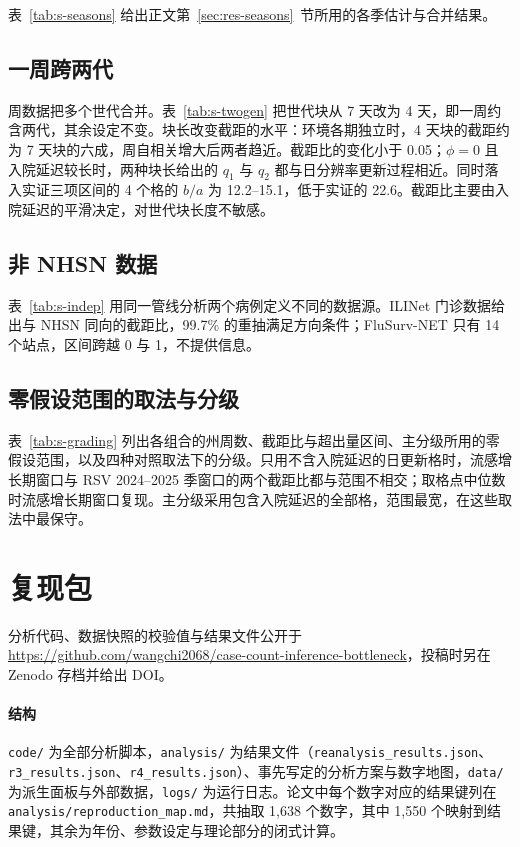 \documentclass[fontset=none,10pt,a4paper]{ctexart}
\theoremstyle{zhplain}
\begin{document}
表~\ref{tab:s-seasons} 给出正文第~\ref{sec:res-seasons}~节所用的各季估计与合并结果。

\subsection{一周跨两代}
\label{sec:s-twogen}

周数据把多个世代合并。表~\ref{tab:s-twogen} 把世代块从 7 天改为 4 天，即一周约含两代，其余设定不变。块长改变截距的水平：环境各期独立时，4 天块的截距约为 7 天块的六成，周自相关增大后两者趋近。截距比的变化小于 0.05；$\phi=0$ 且入院延迟较长时，两种块长给出的 $q_1$ 与 $q_2$ 都与日分辨率更新过程相近。同时落入实证三项区间的 4 个格的 $b/a$ 为 12.2--15.1，低于实证的 22.6。截距比主要由入院延迟的平滑决定，对世代块长度不敏感。

\subsection{非 NHSN 数据}
\label{sec:s-indep}

表~\ref{tab:s-indep} 用同一管线分析两个病例定义不同的数据源。ILINet 门诊数据给出与 NHSN 同向的截距比，99.7\% 的重抽满足方向条件；FluSurv-NET 只有 14 个站点，区间跨越 0 与 1，不提供信息。

\subsection{零假设范围的取法与分级}
\label{sec:s-grading}

表~\ref{tab:s-grading} 列出各组合的州周数、截距比与超出量区间、主分级所用的零假设范围，以及四种对照取法下的分级。只用不含入院延迟的日更新格时，流感增长期窗口与 RSV 2024--2025 季窗口的两个截距比都与范围不相交；取格点中位数时流感增长期窗口复现。主分级采用包含入院延迟的全部格，范围最宽，在这些取法中最保守。


\FloatBarrier

\section{复现包}
\label{sec:s-repro}

分析代码、数据快照的校验值与结果文件公开于 \url{https://github.com/wangchi2068/case-count-inference-bottleneck}，投稿时另在 Zenodo 存档并给出 DOI。

\paragraph{结构} \nolinkurl{code/} 为全部分析脚本，\nolinkurl{analysis/} 为结果文件（\nolinkurl{reanalysis_results.json}、\nolinkurl{r3_results.json}、\nolinkurl{r4_results.json}）、事先写定的分析方案与数字地图，\nolinkurl{data/} 为派生面板与外部数据，\nolinkurl{logs/} 为运行日志。论文中每个数字对应的结果键列在 \nolinkurl{analysis/reproduction_map.md}，共抽取 1,638 个数字，其中 1,550 个映射到结果键，其余为年份、参数设定与理论部分的闭式计算。
\end{document}
